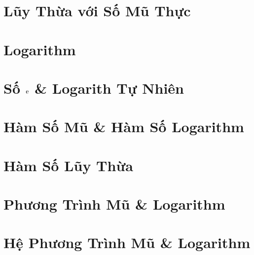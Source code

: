 \documentclass[oneside]{book}
\numberwithin{equation}{section}
\begin{document}

\section{Lũy Thừa với Số Mũ Thực}


\section{Logarithm}


\section{Số $\rm e$ \& Logarith Tự Nhiên}


\section{Hàm Số Mũ \& Hàm Số Logarithm}


\section{Hàm Số Lũy Thừa}


\section{Phương Trình Mũ \& Logarithm}


\section{Hệ Phương Trình Mũ \& Logarithm}

\end{document}
